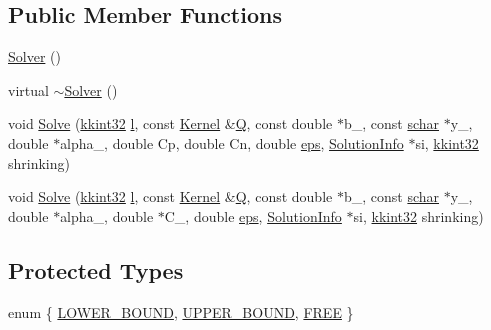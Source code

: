 \subsection*{Public Member Functions}
\begin{DoxyCompactItemize}
\item 
\hyperlink{class_s_v_m233_1_1_solver_a9b14539a3db38b9127000f73b35d39fc}{Solver} ()
\item 
virtual \hyperlink{class_s_v_m233_1_1_solver_a91ca99776c17141c1a5ab4ba2cc2dc0c}{$\sim$\+Solver} ()
\item 
void \hyperlink{class_s_v_m233_1_1_solver_a311741b5b976facb36d49110b0a8fa9a}{Solve} (\hyperlink{namespace_k_k_b_a8fa4952cc84fda1de4bec1fbdd8d5b1b}{kkint32} \hyperlink{class_s_v_m233_1_1_solver_a258ab441755a415c6b1f0b19f55f36fc}{l}, const \hyperlink{class_s_v_m233_1_1_kernel}{Kernel} \&\hyperlink{class_s_v_m233_1_1_solver_a09e21006f46841e5c9c6f97b87995743}{Q}, const double $\ast$b\+\_\+, const \hyperlink{namespace_s_v_m233_afb4ec48497a25626275d52266ac9d7d8}{schar} $\ast$y\+\_\+, double $\ast$alpha\+\_\+, double Cp, double Cn, double \hyperlink{class_s_v_m233_1_1_solver_a5332bb5b52696238e1a9e784e187a901}{eps}, \hyperlink{struct_s_v_m233_1_1_solver_1_1_solution_info}{Solution\+Info} $\ast$si, \hyperlink{namespace_k_k_b_a8fa4952cc84fda1de4bec1fbdd8d5b1b}{kkint32} shrinking)
\item 
void \hyperlink{class_s_v_m233_1_1_solver_a97fd3737bfad95bdce3bb35fa894ff4b}{Solve} (\hyperlink{namespace_k_k_b_a8fa4952cc84fda1de4bec1fbdd8d5b1b}{kkint32} \hyperlink{class_s_v_m233_1_1_solver_a258ab441755a415c6b1f0b19f55f36fc}{l}, const \hyperlink{class_s_v_m233_1_1_kernel}{Kernel} \&\hyperlink{class_s_v_m233_1_1_solver_a09e21006f46841e5c9c6f97b87995743}{Q}, const double $\ast$b\+\_\+, const \hyperlink{namespace_s_v_m233_afb4ec48497a25626275d52266ac9d7d8}{schar} $\ast$y\+\_\+, double $\ast$alpha\+\_\+, double $\ast$C\+\_\+, double \hyperlink{class_s_v_m233_1_1_solver_a5332bb5b52696238e1a9e784e187a901}{eps}, \hyperlink{struct_s_v_m233_1_1_solver_1_1_solution_info}{Solution\+Info} $\ast$si, \hyperlink{namespace_k_k_b_a8fa4952cc84fda1de4bec1fbdd8d5b1b}{kkint32} shrinking)
\end{DoxyCompactItemize}
\subsection*{Protected Types}
\begin{DoxyCompactItemize}
\item 
enum \{ \hyperlink{class_s_v_m233_1_1_solver_a0aa061a12d646a89f5a9a3895984e72fa564c861d6783d9e64c559b7a843e9c47}{L\+O\+W\+E\+R\+\_\+\+B\+O\+U\+ND}, 
\hyperlink{class_s_v_m233_1_1_solver_a0aa061a12d646a89f5a9a3895984e72fa5c2ee4859d9c24409ccc71736245f617}{U\+P\+P\+E\+R\+\_\+\+B\+O\+U\+ND}, 
\hyperlink{class_s_v_m233_1_1_solver_a0aa061a12d646a89f5a9a3895984e72fac13ca8c90dd94d7ebc0325ad0896fd38}{F\+R\+EE}
 \}
\end{DoxyCompactItemize}
